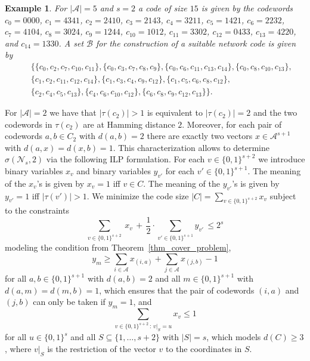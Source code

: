 \documentclass[11pt]{article}
\newcommand{\cA}{\mathcal{A}}
\newcommand{\cN}{\mathcal{N}}
\newtheorem{example}[theorem]{Example}
\begin{document}
\begin{example}
  \label{ex_5}
  For $|\cA|=5$ and $s=2$ a code of size $15$ is given by the codewords $c_0=0000$, $c_1=4341$, $c_2=2410$, $c_3=2143$, $c_4=3211$, $c_5=1421$, 
  $c_6=2232$, $c_7=4104$, $c_8=3024$, $c_9=1244$, $c_{10}=1012$, $c_{11}=3302$, $c_{12}=0433$, $c_{13}=4220$, and $c_{14}=1330$. A set 
  $\mathcal{B}$ for the construction of a suitable network code is given by
  \begin{eqnarray*}
    && \Big\{
      \{c_0,c_2,c_7,c_{10},c_{11}\}, 
      \{c_0,c_3,c_7,c_8,c_9\},
      \{c_0,c_6,c_{11},c_{13},c_{14}\},
      \{c_0,c_8,c_{10},c_{13}\},\\ 
    &&\{c_1,c_2,c_{11},c_{12},c_{14}\}, 
      \{c_1,c_3,c_4,c_9,c_{12}\},
      \{c_1,c_5,c_6,c_8,c_{12}\},\\  
    &&\{c_2,c_4,c_5,c_{13}\}, 
      \{c_4,c_6,c_{10},c_{12}\}, 
      \{c_6,c_8,c_9,c_{12},c_{13}\}  
    \Big\}.
  \end{eqnarray*}
\end{example}

\medskip

For $|\cA| =2$ we have that $|\tau(c_2)|>1$ is equivalent to $|\tau(c_2)|=2$ and the two codewords in $\tau(c_2)$ are at Hamming distance $2$. Moreover, for each pair of codewords 
$a,b\in C_2$ with $d(a,b)=2$ there are exactly two vectors $x\in\cA^{s+1}$ with $d(a,x)=d(x,b)=1$. This characterization allows to determine $\sigma(\cN_s,2)$ via the 
following ILP formulation. For each $v\in \{0,1\}^{s+2}$ we introduce binary variables $x_v$ and binary variables $y_{v'}$ for each $v'\in \{0,1\}^{s+1}$. The meaning of the
$x_v$'s is given by $x_v=1$ iff $v\in C$. The meaning of the $y_{v'}$'s is given by $y_{v'}=1$ iff $|\tau(v')|>1$. We minimize the code size 
$|C|=\sum_{v\in\{0,1\}^{s+2}} x_v$ subject to the constraints
\begin{equation}
  \sum_{v\in \{0,1\}^{s+2}}\ x_v \,+\, \frac{1}{2}\cdot \!\!\!\!\!\sum_{v'\in \{0,1\}^{s+1}} y_{v'} \,\le 2^{s}
\end{equation} 
modeling the condition from Theorem~\ref{thm_cover_problem},
\begin{equation}
  y_{m} \ge \sum_{i\in \cA} x_{(i,a)}+\sum_{j\in\cA} x_{(j,b)}-1
\end{equation}  
for all $a,b\in\{0,1\}^{s+1}$ with $d(a,b)=2$ and all $m\in \{0,1\}^{s+1}$ with $d(a,m)=d(m,b)=1$, which ensures 
that the pair of codewords $(i,a)$ and $(j,b)$ can only be taken if $y_m=1$, and
\begin{equation}
  \sum_{v\in\{0,1\}^{s+2}\,:\, v|_S=u} x_v \le 1
\end{equation}
for all $u\in \{0,1\}^s$ and all $S\subseteq \{1,\dots,s+2\}$ with $|S|=s$, which models $d(C)\ge 3$, where $v|_S$ is the restriction of the vector $v$ to the coordinates in $S$.
\end{document}
